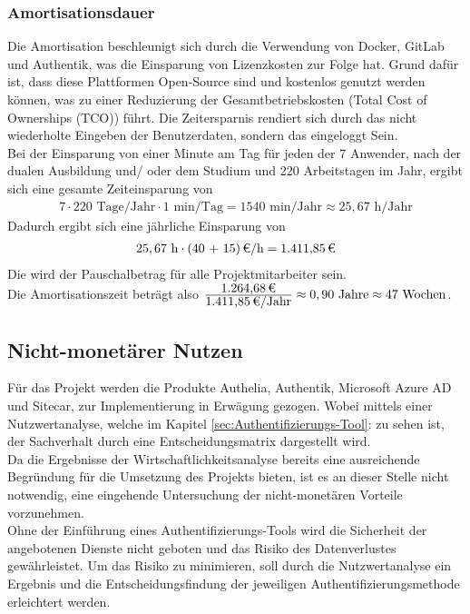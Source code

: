 \subsubsection{Amortisationsdauer}
\label{sec:Amortisationsdauer}
Die Amortisation beschleunigt sich durch die Verwendung von Docker, GitLab und Authentik, was die Einsparung von Lizenzkosten zur Folge hat. 
Grund dafür ist, dass diese Plattformen Open-Source sind und kostenlos genutzt werden können, was zu einer Reduzierung der  
Gesamtbetriebskosten (Total Cost of Ownerships (\acs{TCO})) führt.  
Die Zeitersparnis rendiert sich durch das nicht wiederholte Eingeben der Benutzerdaten, sondern das eingeloggt Sein.
\\Bei der Einsparung von einer Minute am Tag für jeden der 7 Anwender, nach der dualen Ausbildung und/ oder dem Studium und 
220 Arbeitstagen im Jahr, ergibt sich eine gesamte Zeiteinsparung von 
\begin{eqnarray}
7 \cdot 220 \mbox{ Tage/Jahr} \cdot 1 \mbox{ min/Tag} = 1540 \mbox{ min/Jahr} \approx 25,67 \mbox{ h/Jahr} 
\end{eqnarray}
Dadurch ergibt sich eine jährliche Einsparung von 
\begin{eqnarray}
25,67 \mbox{ h} \cdot \eur{(40 + 15)}{\mbox{/h}} = \eur{1.411,85}
\end{eqnarray}
Die  wird der Pauschalbetrag für alle Projektmitarbeiter sein.
\\Die Amortisationszeit beträgt also $\frac{\eur{1.264,68}}{\eur{1.411,85}\mbox{/Jahr}} \approx 0,90 \mbox{ Jahre} \approx 47 \mbox{ Wochen}$.

\subsection{Nicht-monetärer Nutzen}
\label{sec:Nicht-monetärer Nutzen}
Für das Projekt werden die Produkte Authelia, Authentik, Microsoft Azure AD und Sitecar, zur Implementierung in Erwägung gezogen. 
Wobei mittels einer Nutzwertanalyse, welche im Kapitel \ref{sec:Authentifizierungs-Tool}:  zu sehen ist, der 
Sachverhalt durch eine Entscheidungsmatrix dargestellt wird.
\\Da die Ergebnisse der Wirtschaftlichkeitsanalyse bereits eine ausreichende Begründung für die Umsetzung des Projekts bieten, 
ist es an dieser Stelle nicht notwendig, eine eingehende Untersuchung der nicht-monetären Vorteile vorzunehmen.
\\Ohne der Einführung eines Authentifizierungs-Tools wird die Sicherheit der angebotenen Dienste nicht geboten und das Risiko des 
Datenverlustes gewährleistet. Um das Risiko zu minimieren, soll durch die Nutzwertanalyse ein Ergebnis und die Entscheidungsfindung 
der jeweiligen Authentifizierungsmethode erleichtert werden.

